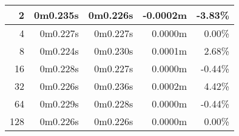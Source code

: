 \documentclass[documentation.tex]{subfiles}
\begin{document}
\begin{longtable}{|r|r|r|r|r|}
        2                                                                                                                         & 0m0.235s                        & 0m0.226s                                                                    & {\color[HTML]{FF0000} -0.0002m}                   & {\color[HTML]{FF0000} -3.83\%}                    \\ \hline
        4                                                                                                                         & 0m0.227s                        & 0m0.227s                                                                    & {\color[HTML]{32CB00} 0.0000m}                    & {\color[HTML]{32CB00} 0.00\%}                     \\ \hline
        8                                                                                                                         & 0m0.224s                        & 0m0.230s                                                                    & {\color[HTML]{32CB00} 0.0001m}                    & {\color[HTML]{32CB00} 2.68\%}                     \\ \hline
        16                                                                                                                        & 0m0.228s                        & 0m0.227s                                                                    & {\color[HTML]{FF0000} 0.0000m}                    & {\color[HTML]{FF0000} -0.44\%}                    \\ \hline
        32                                                                                                                        & 0m0.226s                        & 0m0.236s                                                                    & {\color[HTML]{32CB00} 0.0002m}                    & {\color[HTML]{32CB00} 4.42\%}                     \\ \hline
        64                                                                                                                        & 0m0.229s                        & 0m0.228s                                                                    & {\color[HTML]{FF0000} 0.0000m}                    & {\color[HTML]{FF0000} -0.44\%}                    \\ \hline
        128                                                                                                                       & 0m0.226s                        & 0m0.226s                                                                    & {\color[HTML]{32CB00} 0.0000m}                    & {\color[HTML]{32CB00} 0.00\%}                     \\ \hline

\end{longtable}
\end{document}
